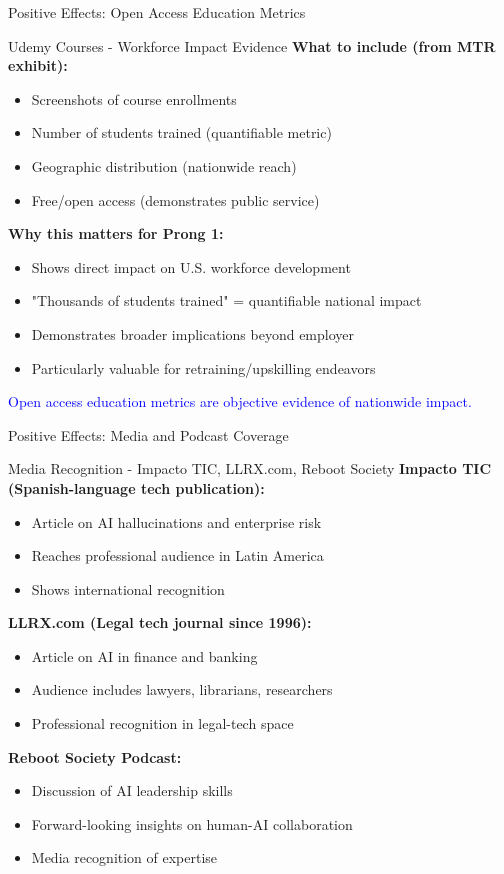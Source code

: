 \documentclass[11pt]{beamer}
\begin{document}
	\begin{frame}{Positive Effects: Open Access Education Metrics}
		\scriptsize
		\begin{block}{Udemy Courses - Workforce Impact Evidence}
			\textbf{What to include (from MTR exhibit):}
			\begin{itemize}
				\item Screenshots of course enrollments
				\item Number of students trained (quantifiable metric)
				\item Geographic distribution (nationwide reach)
				\item Free/open access (demonstrates public service)
			\end{itemize}
			\textbf{Why this matters for Prong 1:}
			\begin{itemize}
				\item Shows direct impact on U.S. workforce development
				\item "Thousands of students trained" = quantifiable national impact
				\item Demonstrates broader implications beyond employer
				\item Particularly valuable for retraining/upskilling endeavors
			\end{itemize}
			\textcolor{blue}{Open access education metrics are objective evidence of nationwide impact.}
		\end{block}
	\end{frame}
	
	\begin{frame}{Positive Effects: Media and Podcast Coverage}
		\scriptsize
		\begin{block}{Media Recognition - Impacto TIC, LLRX.com, Reboot Society}
			\textbf{Impacto TIC (Spanish-language tech publication):}
			\begin{itemize}
				\item Article on AI hallucinations and enterprise risk
				\item Reaches professional audience in Latin America
				\item Shows international recognition
			\end{itemize}
			\textbf{LLRX.com (Legal tech journal since 1996):}
			\begin{itemize}
				\item Article on AI in finance and banking
				\item Audience includes lawyers, librarians, researchers
				\item Professional recognition in legal-tech space
			\end{itemize}
			\textbf{Reboot Society Podcast:}
			\begin{itemize}
				\item Discussion of AI leadership skills
				\item Forward-looking insights on human-AI collaboration
				\item Media recognition of expertise
			\end{itemize}
		\end{block}
	\end{frame}
	
\end{document}
